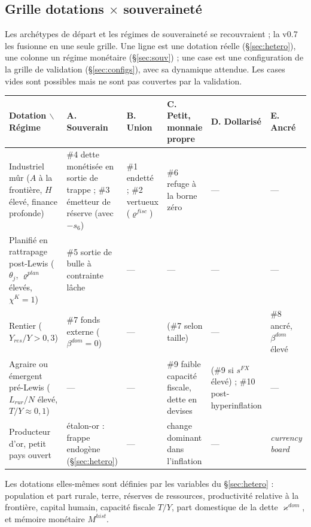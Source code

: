 \documentclass[11pt,a4paper]{article}
\begin{document}
\subsection{Grille dotations $\times$ souveraineté}
\label{sec:archetypes}
Les archétypes de départ et les régimes de souveraineté se recouvraient ; la v0.7 les fusionne en une seule grille. Une ligne est une dotation réelle (\S\ref{sec:hetero}), une colonne un régime monétaire (\S\ref{sec:souv}) ; une case est une configuration de la grille de validation (\S\ref{sec:configs}), avec sa dynamique attendue. Les cases vides sont possibles mais ne sont pas couvertes par la validation.
\begin{center}\footnotesize
\begin{tabular}{p{2.5cm}p{2.5cm}p{2.5cm}p{2.5cm}p{2.0cm}p{2.0cm}}
\toprule
\textbf{Dotation $\backslash$ Régime} & \textbf{A. Souverain} & \textbf{B. Union} & \textbf{C. Petit, monnaie propre} & \textbf{D. Dollarisé} & \textbf{E. Ancré}\\
\midrule
Industriel mûr ($A$ à la frontière, $H$ élevé, finance profonde) & \#4 dette monétisée en sortie de trappe ; \#3 émetteur de réserve (avec $-s_6$) & \#1 endetté ; \#2 vertueux ($\varrho^{fisc}$) & \#6 refuge à la borne zéro & --- & ---\\
Planifié en rattrapage post-Lewis ($\theta_j$, $\varrho^{plan}$ élevés, $\chi^K=1$) & \#5 sortie de bulle à contrainte lâche & --- & --- & --- & ---\\
Rentier ($Y_{res}/Y>0{,}3$) & \#7 fonds externe ($\beta^{dom}=0$) & --- & (\#7 selon taille) & --- & \#8 ancré, $\beta^{dom}$ élevé\\
Agraire ou émergent pré-Lewis ($L_{rur}/N$ élevé, $T/Y\approx0{,}1$) & --- & --- & \#9 faible capacité fiscale, dette en devises & (\#9 si $s^{FX}$ élevé) ; \#10 post-hyperinflation & ---\\
Producteur d'or, petit pays ouvert & étalon-or : frappe endogène (\S\ref{sec:hetero}) & --- & change dominant dans l'inflation & --- & \emph{currency board}\\
\bottomrule
\end{tabular}
\end{center}
Les dotations elles-mêmes sont définies par les variables du \S\ref{sec:hetero} : population et part rurale, terre, réserves de ressources, productivité relative à la frontière, capital humain, capacité fiscale $T/Y$, part domestique de la dette $\varkappa^{dom}$, et mémoire monétaire $M^{hist}$.

\end{document}
